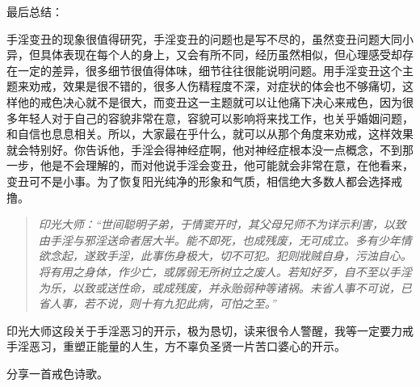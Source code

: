 最后总结：

手淫变丑的现象很值得研究，手淫变丑的问题也是写不尽的，虽然变丑问题大同小异，但具体表现在每个人的身上，又会有所不同，经历虽然相似，但心理感受却存在一定的差异，很多细节很值得体味，细节往往很能说明问题。用手淫变丑这个主题来劝戒，效果是很不错的，很多人伤精程度不深，对症状的体会也不够痛切，这样他的戒色决心就不是很大，而变丑这一主题就可以让他痛下决心来戒色，因为很多年轻人对于自己的容貌非常在意，容貌可以影响将来找工作，也关乎婚姻问题，和自信也息息相关。所以，大家最在乎什么，就可以从那个角度来劝戒，这样效果就会特别好。你告诉他，手淫会得神经症啊，他对神经症根本没一点概念，不到那一步，他是不会理解的，而对他说手淫会变丑，他可能就会非常在意，在他看来，变丑可不是小事。为了恢复阳光纯净的形象和气质，相信绝大多数人都会选择戒撸。

\begin{quote}\it
    印光大师：“世间聪明子弟，于情窦开时，其父母兄师不为详示利害，以致由手淫与邪淫送命者居大半。能不即死，也成残废，无可成立。多有少年情欲念起，遂致手淫，此事伤身极大，切不可犯。犯则戕贼自身，污浊自心。将有用之身体，作少亡，或孱弱无所树立之废人。若知好歹，自不至以手淫为乐，以致或送性命，或成残废，并永贻弱种等诸祸。未省人事不可说，已省人事，若不说，则十有九犯此病，可怕之至。”
\end{quote}

印光大师这段关于手淫恶习的开示，极为恳切，读来很令人警醒，我等一定要力戒手淫恶习，重塑正能量的人生，方不辜负圣贤一片苦口婆心的开示。

分享一首戒色诗歌。

